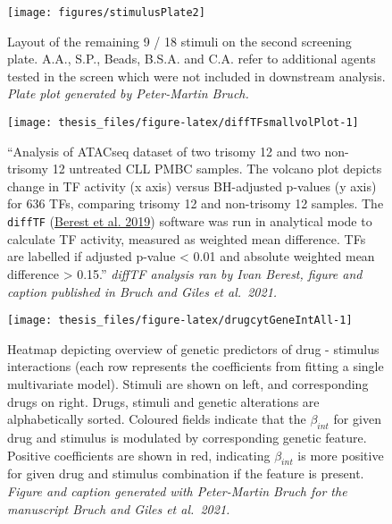\documentclass[11pt, a4paper, twosided]{book}
\begin{document}
\begin{figure}

{\centering \texttt{[image: figures/stimulusPlate2]} 

}

\caption{Layout of the remaining 9 / 18 stimuli on the second screening plate. A.A., S.P., Beads, B.S.A. and C.A. refer to additional agents tested in the screen which were not included in downstream analysis. \emph{Plate plot generated by Peter-Martin Bruch.}}\label{fig:stimulusPlot2}
\end{figure}

\begin{figure}

{\centering \texttt{[image: thesis\_files/figure-latex/diffTFsmallvolPlot-1]} 

}

\caption{``Analysis of ATACseq dataset of two trisomy 12 and two non-trisomy 12 untreated CLL PMBC samples. The volcano plot depicts change in TF activity (x axis) versus BH-adjusted p-values (y axis) for 636 TFs, comparing trisomy 12 and non-trisomy 12 samples. The \texttt{diffTF} (\protect\hyperlink{ref-Berest2019}{Berest et al. 2019}) software was run in analytical mode to calculate TF activity, measured as weighted mean difference. TFs are labelled if adjusted p-value \textless{} 0.01 and absolute weighted mean difference \textgreater{} 0.15.'' \emph{diffTF analysis ran by Ivan Berest, figure and caption published in Bruch and Giles et al.~2021.}}\label{fig:diffTFsmallvolPlot}
\end{figure}
\newpage


\begin{figure}

{\centering \texttt{[image: thesis\_files/figure-latex/drugcytGeneIntAll-1]} 

}

\caption{Heatmap depicting overview of genetic predictors of drug - stimulus interactions (each row represents the coefficients from fitting a single multivariate model). Stimuli are shown on left, and corresponding drugs on right. Drugs, stimuli and genetic alterations are alphabetically sorted. Coloured fields indicate that the \(\beta_{int}\) for given drug and stimulus is modulated by corresponding genetic feature. Positive coefficients are shown in red, indicating \(\beta_{int}\) is more positive for given drug and stimulus combination if the feature is present. \emph{Figure and caption generated with Peter-Martin Bruch for the manuscript Bruch and Giles et al.~2021.}}\label{fig:drugcytGeneIntAll}
\end{figure}
\newpage
\end{document}
